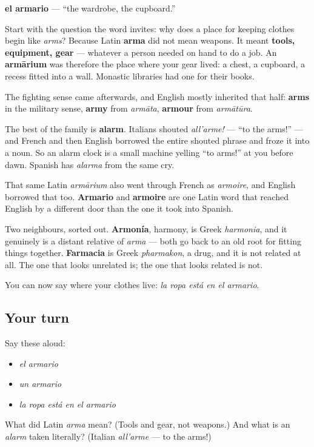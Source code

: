 \begin{cousinweb}
\textbf{el armario} — \textquotedblleft{}the wardrobe, the cupboard.\textquotedblright{}

Start with the question the word invites: why does a place for keeping clothes begin like \emph{arms}? Because Latin \textbf{arma} did not mean weapons. It meant \textbf{tools, equipment, gear} — whatever a person needed on hand to do a job. An \textbf{armārium} was therefore the place where your gear lived: a chest, a cupboard, a recess fitted into a wall. Monastic libraries had one for their books.

The fighting sense came afterwards, and English mostly inherited that half: \textbf{arms} in the military sense, \textbf{army} from \emph{armāta}, \textbf{armour} from \emph{armātūra}.

The best of the family is \textbf{alarm}. Italians shouted \emph{all'arme!} — \textquotedblleft{}to the arms!\textquotedblright{} — and French and then English borrowed the entire shouted phrase and froze it into a noun. So an alarm clock is a small machine yelling \textquotedblleft{}to arms!\textquotedblright{} at you before dawn. Spanish has \emph{alarma} from the same cry.

That same Latin \emph{armārium} also went through French as \emph{armoire}, and English borrowed that too. \textbf{Armario} and \textbf{armoire} are one Latin word that reached English by a different door than the one it took into Spanish.

Two neighbours, sorted out. \textbf{Armonía}, harmony, is Greek \emph{harmonia}, and it genuinely is a distant relative of \emph{arma} — both go back to an old root for fitting things together. \textbf{Farmacia} is Greek \emph{pharmakon}, a drug, and it is not related at all. The one that looks unrelated is; the one that looks related is not.
\end{cousinweb}

\begin{grammarlens}[title={What you've built}]
You can now say where your clothes live: \emph{la ropa está en el armario}.
\end{grammarlens}

\subsection*{Your turn}
Say these aloud:

\begin{itemize}
\raggedright
  \item \emph{el armario}
  \item \emph{un armario}
  \item \emph{la ropa está en el armario}
\end{itemize}

\begin{tcolorbox}[breakable,colback=teal!4,colframe=teal!35!black,title={Before you move on}]
What did Latin \emph{arma} mean? (Tools and gear, not weapons.) And what is an \emph{alarm} taken literally? (Italian \emph{all'arme} — to the arms!)
\end{tcolorbox}

